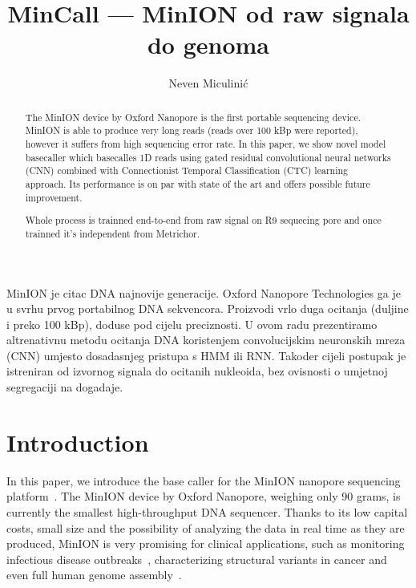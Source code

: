 \documentclass[times, utf8, seminar, numeric]{fer}
\begin{document}
\theoremstyle{definition}
\newtheorem{definition}{Definition}[section]

\title{MinCall --- MinION od raw signala do genoma}
\author{Neven Miculinić}

\maketitle
\tableofcontents

\begin{sazetak}
MinION je citac DNA najnovije generacije. Oxford Nanopore Technologies ga je u svrhu prvog portabilnog DNA sekvencora. Proizvodi vrlo duga ocitanja (duljine i preko 100 kBp), doduse pod cijelu preciznosti. U ovom radu prezentiramo altrenativnu metodu ocitanja DNA koristenjem convolucijskim neuronskih mreza (CNN) umjesto dosadasnjeg pristupa s HMM ili RNN. Takoder cijeli postupak je istreniran od izvornog signala do ocitanih nukleoida, bez ovisnosti o umjetnoj segregaciji na dogadaje.

\end{sazetak}

\begin{abstract}
    The MinION device by Oxford Nanopore is the first portable sequencing device. MinION is able to produce very long reads (reads over 100 kBp were reported), however it suffers from high sequencing error rate. In this paper, we show novel model basecaller which basecalles 1D reads using gated residual convolutional neural networks (CNN) combined with Connectionist Temporal Classification (CTC) learning approach. Its performance is on par with state of the art and offers possible future improvement.

    Whole process is trainned end-to-end from raw signal on R9 sequecing pore and once trainned it's independent from Metrichor.
\end{abstract}

\chapter{Introduction}

In this paper, we introduce the base caller for the MinION nanopore sequencing platform~\cite{mikheyev2014first}. The MinION device by Oxford Nanopore, weighing only 90 grams, is currently the smallest high-throughput DNA sequencer. Thanks to its low capital costs, small size and the possibility of analyzing the data in real time as they are produced, MinION is very promising for clinical applications, such as monitoring infectious disease outbreaks~\cite{judge2015early}\cite{quick2016real}, characterizing structural variants in cancer\cite{norris2016nanopore} and even full human genome assembly~\cite{jain2017nanopore}.
\end{document}
